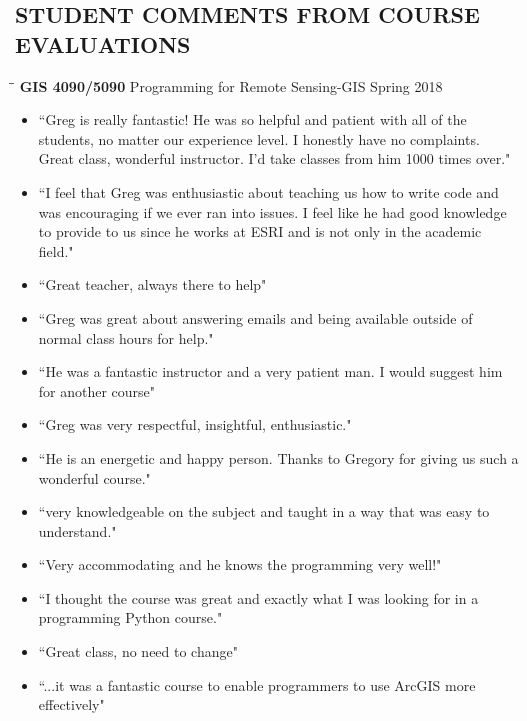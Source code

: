 \documentclass{res}
\begin{document}
\begin{resume}
 
\section{STUDENT COMMENTS FROM COURSE EVALUATIONS}
   \vspace{-0.1in}	

\begin{tabbing}
	\hspace{2.3in}\= \hspace{2.6in}\= \kill %
	{\bf GIS 4090/5090} \>Programming for Remote Sensing-GIS     \>Spring 2018\\
	\>
\end{tabbing}\vspace{-20pt}      %
\begin{itemize}  
\item``Greg is really fantastic! He was so helpful and patient with all of the students, no matter our experience level. I honestly have no complaints. Great class, wonderful instructor. I'd take classes from him 1000 times over."
\item``I feel that Greg was enthusiastic about teaching us how to write code and was encouraging if we ever ran into issues. I feel like he had good knowledge to provide to us since he works at ESRI and is not only in the academic field."
\item``Great teacher, always there to help"
\item``Greg was great about answering emails and being available outside of normal class hours for help."
\item``He was a fantastic instructor and a very patient man. I would suggest him for another course"
\item``Greg was very respectful, insightful, enthusiastic."
\item``He is an energetic and happy person. Thanks to Gregory for giving us such a wonderful course."
\item``very knowledgeable on the subject and taught in a way that was easy to understand."
\item``Very accommodating and he knows the programming very well!"\\
\item``I thought the course was great and exactly what I was looking for in a programming Python course."
\item``Great class, no need to change"
\item``...it was a fantastic course to enable programmers to use ArcGIS more effectively"

\end{itemize}
\end{resume}
\end{document}
